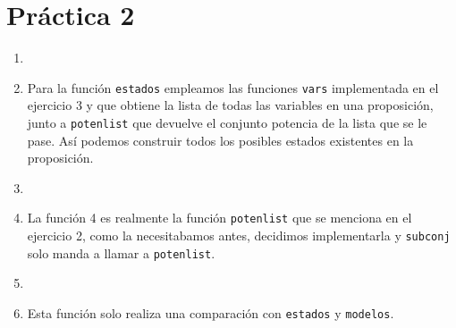 \documentclass{article}
\newcommand{\code}[1]{\textcolor{white!25!black}{\texttt{#1}}}
\begin{document}
\section*{\LARGE{Práctica 2}}
\begin{enumerate}
\item 
\item Para la función \code{estados} empleamos las funciones \code{vars}
  implementada en el ejercicio 3 y que obtiene la lista de todas las
  variables en una proposición, junto a \code{potenlist} que devuelve el
  conjunto potencia de la lista que se le pase. Así podemos construir todos
  los posibles estados existentes en la proposición.
\item 
\item La función 4 es realmente la función \code{potenlist} que se menciona
  en el ejercicio 2, como la necesitabamos antes, decidimos implementarla
  y \code{subconj} solo manda a llamar a \code{potenlist}.
\item 
\item Esta función solo realiza una comparación con \code{estados} y \code{modelos}.
\end{enumerate}
\end{document}
